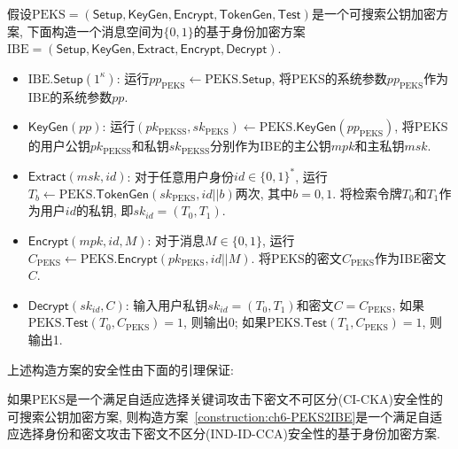 \begin{construction}[从PEKS到IBE的转化]\label{construction:ch6-PEKS2IBE}
假设$\text{PEKS} = (\mathsf{Setup}, \mathsf{KeyGen}, \mathsf{Encrypt}, \mathsf{TokenGen}, \mathsf{Test})$是一个可搜索公钥加密方案, 下面构造一个消息空间为$\{0, 1\}$的基于身份加密方案$\text{IBE} = (\mathsf{Setup}, \mathsf{KeyGen}, \mathsf{Extract}, \mathsf{Encrypt}, \mathsf{Decrypt})$.
\begin{itemize}
\item $\text{IBE}.\mathsf{Setup}(1^\kappa)$: 运行$pp_{\text{PEKS}} \leftarrow \text{PEKS}.\mathsf{Setup}$, 将PEKS的系统参数$pp_{\text{PEKS}}$作为IBE的系统参数$pp$.

\item $\mathsf{KeyGen}(pp)$: 运行$(pk_{\text{PEKSS}}, sk_{\text{PEKS}}) \leftarrow \text{PEKS}.\mathsf{KeyGen}(pp_{\text{PEKS}})$, 将PEKS的用户公钥$pk_{\text{PEKSS}}$和私钥$sk_{\text{PEKSS}}$分别作为IBE的主公钥$mpk$和主私钥$msk$.

\item $\mathsf{Extract}(msk, id)$: 对于任意用户身份$id \in \{0, 1\}^*$, 运行$T_b \leftarrow \text{PEKS}.\mathsf{TokenGen}(sk_{\text{PEKS}}, id||b)$两次, 其中$b = 0, 1$. 将检索令牌$T_0$和$T_1$作为用户$id$的私钥, 即$sk_{id} = (T_0, T_1)$.

\item $\mathsf{Encrypt}(mpk, id, M)$: 对于消息$M \in \{0, 1\}$, 运行$C_{\text{PEKS}} \leftarrow \text{PEKS}.\mathsf{Encrypt}(pk_{\text{PEKS}}, id||M)$. 将PEKS的密文$C_{\text{PEKS}}$作为IBE密文$C$.

\item $\mathsf{Decrypt}(sk_{id}, C)$: 输入用户私钥$sk_{id} = (T_0, T_1)$和密文$C = C_{\text{PEKS}}$, 如果$\text{PEKS}.\mathsf{Test}(T_0, C_{\text{PEKS}}) = 1$, 则输出0; 如果$\text{PEKS}.\mathsf{Test}(T_1, C_{\text{PEKS}}) = 1$, 则输出1.
\end{itemize}
\end{construction}

上述构造方案的安全性由下面的引理保证:
\begin{lemma}
如果$\text{PEKS}$是一个满足自适应选择关键词攻击下密文不可区分(CI-CKA)安全性的可搜索公钥加密方案, 则构造方案~\ref{construction:ch6-PEKS2IBE}是一个满足自适应选择身份和密文攻击下密文不区分(IND-ID-CCA)安全性的基于身份加密方案.
\end{lemma}

